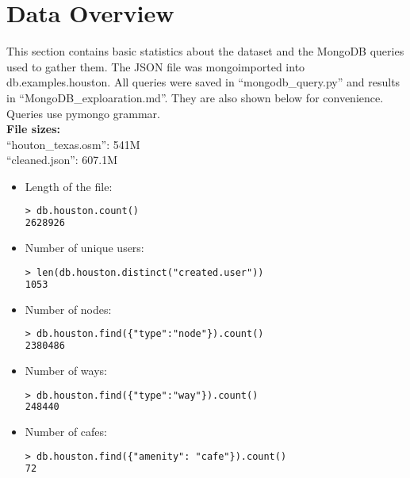 \documentclass[12pt]{article}
\begin{document}
\section{Data Overview}
This section contains basic statistics about the dataset and the MongoDB queries used to gather them. The JSON file was mongoimported into db.examples.houston. All queries were saved in ``mongodb\_query.py'' and results in ``MongoDB\_exploaration.md''. They are also shown below for convenience. Queries use pymongo grammar.\\
\textbf{File sizes:}\\
``houton\_texas.osm'': 541M\\
``cleaned.json'': 607.1M
\begin{itemize}
\item Length of the file:
\begin{lstlisting}[language=xml,breaklines=tr, basicstyle=\small,keywordstyle=\color{blue!70},commentstyle=\color{red!50!green!50!blue!50},frame=shadowbox, rulesepcolor=\color{red!20!green!20!blue!20}]
> db.houston.count()
2628926
\end{lstlisting}

\item Number of unique users:
\begin{lstlisting}[language=xml,breaklines=tr, basicstyle=\small,keywordstyle=\color{blue!70},commentstyle=\color{red!50!green!50!blue!50},frame=shadowbox, rulesepcolor=\color{red!20!green!20!blue!20}]
> len(db.houston.distinct("created.user"))
1053
\end{lstlisting}

\item Number of nodes:
\begin{lstlisting}[language=xml,breaklines=tr, basicstyle=\small,keywordstyle=\color{blue!70},commentstyle=\color{red!50!green!50!blue!50},frame=shadowbox, rulesepcolor=\color{red!20!green!20!blue!20}]
> db.houston.find({"type":"node"}).count()
2380486
\end{lstlisting}

\item Number of ways:
\begin{lstlisting}[language=xml,breaklines=tr, basicstyle=\small,keywordstyle=\color{blue!70},commentstyle=\color{red!50!green!50!blue!50},frame=shadowbox, rulesepcolor=\color{red!20!green!20!blue!20}]
> db.houston.find({"type":"way"}).count()
248440
\end{lstlisting}

\item Number of cafes:
\begin{lstlisting}[language=xml,breaklines=tr, basicstyle=\small,keywordstyle=\color{blue!70},commentstyle=\color{red!50!green!50!blue!50},frame=shadowbox, rulesepcolor=\color{red!20!green!20!blue!20}]
> db.houston.find({"amenity": "cafe"}).count()
72
\end{lstlisting}


\end{itemize}
\end{document}
